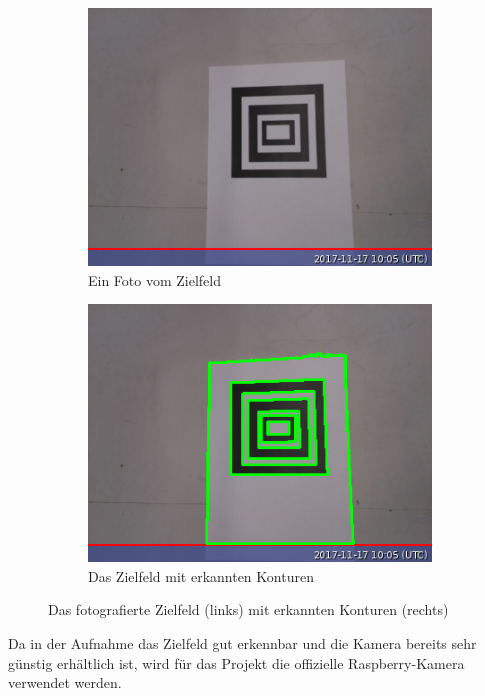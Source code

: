 \begin{figure}
    \begin{subfigure}{0.5\textwidth}
        \centering
        \includegraphics[width=0.9\linewidth]{pics/foto-zielfeld.jpg}
        \caption{Ein Foto vom Zielfeld}
        \label{fig:foto-zielfeld}
    \end{subfigure}
    \begin{subfigure}{0.5\textwidth}
        \centering
        \includegraphics[width=0.9\linewidth]{pics/foto-zielfeld-konturen.jpg}
        \caption{Das Zielfeld mit erkannten Konturen}
        \label{fig:foto-zielfeld-konturen}
    \end{subfigure}
    \caption{Das fotografierte Zielfeld (links) mit erkannten Konturen (rechts)}
\end{figure}

Da in der Aufnahme das Zielfeld gut erkennbar und die Kamera bereits sehr günstig erhältlich ist, wird für das Projekt die offizielle Raspberry-Kamera verwendet werden.

